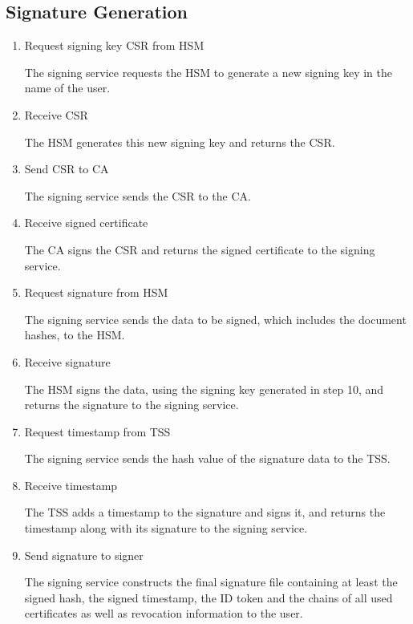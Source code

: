 \subsection{Signature Generation}\label{subsec:signature-generation}
\begin{enumerate}[resume]
    \item Request signing key \gls{CSR} from \gls{HSM}

    The signing service requests the \gls{HSM} to generate a new signing key in the name of the user.

    \item Receive \gls{CSR}

    The \gls{HSM} generates this new signing key and returns the \acrfull{CSR}.

    \item Send \gls{CSR} to \gls{CA}

    The signing service sends the \gls{CSR} to the \gls{CA}.

    \item Receive signed certificate

    The \gls{CA} signs the \gls{CSR} and returns the signed certificate to the signing service.

    \item Request signature from \gls{HSM}

    The signing service sends the data to be signed, which includes the document hashes, to the \gls{HSM}.

    \item Receive signature

    The \gls{HSM} signs the data, using the signing key generated in step 10, and returns the signature to the signing service.

    \item Request timestamp from \gls{TSS}

    The signing service sends the hash value of the signature data to the \gls{TSS}.

    \item Receive timestamp

    The \gls{TSS} adds a timestamp to the signature and signs it,
    and returns the timestamp along with its signature to the signing service.

    \item Send signature to signer

    The signing service constructs the final signature file containing at least the signed hash,
    the signed timestamp, the ID token and the chains of all used certificates as well as revocation information to the user.
\end{enumerate}

